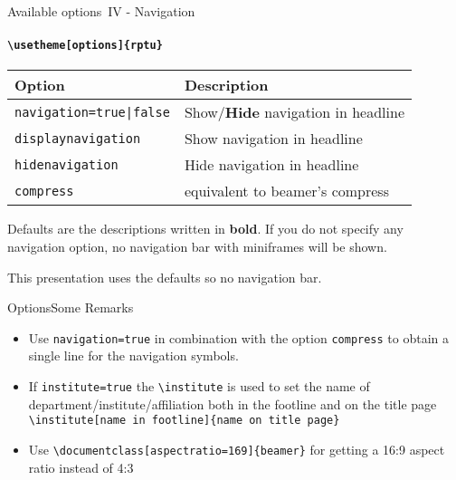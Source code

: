 \documentclass[aspectratio=169]{beamer}
\begin{document}
\begin{frame}{Available options~IV - Navigation}
	\framesubtitle{\texttt{\textbackslash usetheme[options]\{rptu\}}}
	\begin{tabular}{ll}
		\textbf{Option} & \textbf{Description}\\ \toprule
		\texttt{navigation=true|false} &Show/\textbf{Hide} navigation in headline \\
		\texttt{displaynavigation} & Show navigation in headline \\ 
		\texttt{hidenavigation} & Hide navigation in headline \\  \midrule
		\texttt{compress} & equivalent to beamer's compress \\\bottomrule
	\end{tabular}
	\vspace*{2ex}
	
	Defaults are the descriptions written in \textbf{bold}. If you do not specify any navigation option, no navigation bar with miniframes will be shown.
	
	This presentation uses the defaults so no navigation bar.
\end{frame}


\begin{frame}{Options}{Some Remarks}
	\begin{itemize}
		\item Use \texttt{navigation=true} in combination with the option \texttt{compress} to obtain a single line for the navigation symbols.
		\item If \texttt{institute=true} the \texttt{\textbackslash institute} is used to set the name of department/institute/affiliation both in the footline and on the title page\\
		\texttt{\textbackslash institute[name in footline]\{name on title page\}}
		\item Use \texttt{\textbackslash documentclass[aspectratio=169]\{beamer\}} for getting a 16:9 aspect ratio instead of 4:3
	\end{itemize}
\end{frame}
\end{document}
